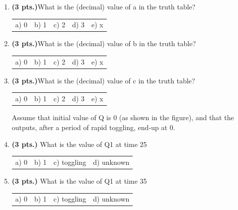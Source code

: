\documentclass{article}
\begin{document}
\begin{enumerate}
\vspace{0.25in}

\item {\bf (3 pts.)}What is the (decimal) value of a in the truth table?

\begin{tabular}{p{0.6in} p{0.6in} p{0.6in} p{0.6in} l}
a) 0 & b) 1 & c) 2 & d) 3 & e) x  
\end{tabular}

\item {\bf (3 pts.)}What is the (decimal) value of b in the truth table?

\begin{tabular}{p{0.6in} p{0.6in} p{0.6in} p{0.6in} l}
a) 0 & b) 1 & c) 2 & d) 3 & e) x  
\end{tabular}

\item {\bf (3 pts.)}What is the (decimal) value of c in the truth table?

\begin{tabular}{p{0.6in} p{0.6in} p{0.6in} p{0.6in} l}
a) 0 & b) 1 & c) 2 & d) 3 & e) x  
\end{tabular}

\pagebreak
Assume that initial value of Q is 0 (as shown in the figure),
and that the outputs, after a period of rapid toggling, 
end-up at 0.


\item {\bf (3 pts.)} What is the value of Q1 at time 25

\begin{tabular}{p{0.75in}p{0.75in}p{0.75in}p{1.25in}}
a) 0 & b) 1 & c) toggling & d) unknown \\
\end{tabular}

\item {\bf (3 pts.)} What is the value of Q1 at time 35

\begin{tabular}{p{0.75in}p{0.75in}p{0.75in}p{1.25in}}
a) 0 & b) 1 & c) toggling & d) unknown \\
\end{tabular}


\end{enumerate}
\end{document}
